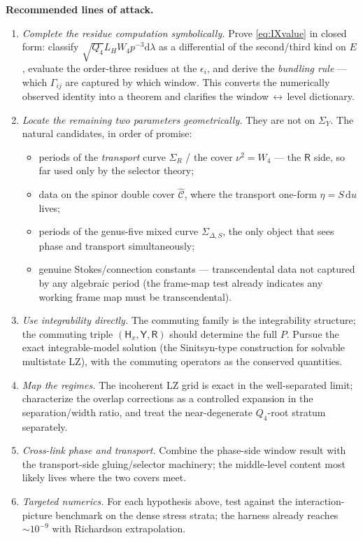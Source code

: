 \documentclass[11pt]{article}
\newcommand{\dd}{\mathrm d}
\newcommand{\Yop}{\mathsf Y}
\newcommand{\Rop}{\mathsf R}
\newcommand{\Hx}{\mathsf H_x}
\begin{document}
\textbf{Recommended lines of attack.}
\begin{enumerate}
 \item \emph{Complete the residue computation symbolically.} Prove
 \eqref{eq:IXvalue} in closed form: classify
 $\sqrt{Q_4}L_H W_4 p^{-3}\dd\lambda$ as a differential of the second/third
 kind on $E$, evaluate the order-three residues at the $\epsilon_i$, and derive
 the \emph{bundling rule} --- which $\Gamma_{ij}$ are captured by which window.
 This converts the numerically observed identity into a theorem and clarifies
 the window$\,\leftrightarrow\,$level dictionary.
 \item \emph{Locate the remaining two parameters geometrically.} They are not on
 $\Sigma_Y$. The natural candidates, in order of promise:
 \begin{itemize}
  \item periods of the \emph{transport} curve $\Sigma_R$ / the cover
  $\nu^2=W_4$ --- the $\Rop$ side, so far used only by the selector theory;
  \item data on the spinor double cover $\widehat{\mathcal C}$, where the
  transport one-form $\eta=S\,\dd u$ lives;
  \item periods of the genus-five mixed curve $\Sigma_{\Delta,S}$, the only
  object that sees phase and transport simultaneously;
  \item genuine Stokes/connection constants --- transcendental data not
  captured by any algebraic period (the frame-map test already indicates any
  working frame map must be transcendental).
 \end{itemize}
 \item \emph{Use integrability directly.} The commuting family is the
 integrability structure; the commuting triple $(\Hx,\Yop,\Rop)$ should
 determine the full $P$. Pursue the exact integrable-model solution (the
 Sinitsyn-type construction for solvable multistate LZ), with the commuting
 operators as the conserved quantities.
 \item \emph{Map the regimes.} The incoherent LZ grid is exact in the
 well-separated limit; characterize the overlap corrections as a controlled
 expansion in the separation/width ratio, and treat the near-degenerate
 $Q_4$-root stratum separately.
 \item \emph{Cross-link phase and transport.} Combine the phase-side window
 result with the transport-side gluing/selector machinery; the middle-level
 content most likely lives where the two covers meet.
 \item \emph{Targeted numerics.} For each hypothesis above, test against the
 interaction-picture benchmark on the dense stress strata; the harness already
 reaches $\sim10^{-9}$ with Richardson extrapolation.
\end{enumerate}
\end{document}
